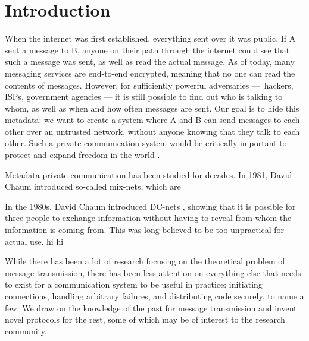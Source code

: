 \section{Introduction}

When the internet was first established, everything sent over it was public. If A sent a message to B, anyone on their path through the internet could see that such a message was sent, as well as read the actual message. As of today, many messaging services are end-to-end encrypted, meaning that no one can read the contents of messages. However, for sufficiently powerful adversaries — hackers, ISPs, government agencies — it is still possible to find out who is talking to whom, as well as when and how often messages are sent. Our goal is to hide this metadata: we want to create a system where A and B can send messages to each other over an untrusted network, without anyone knowing that they talk to each other. Such a private communication system would be critically important to protect and expand freedom in the world \cite{arvid}.

Metadata-private communication has been studied for decades. In 1981, David Chaum introduced so-called mix-nets, which are

In the 1980s, David Chaum introduced DC-nets \cite{chaum1988dining}, showing that it is possible for three people to exchange information without having to reveal from whom the information is coming from. This was long believed to be too unpractical for actual use. hi hi

While there has been a lot of research focusing on the theoretical problem of message transmission, there has been less attention on everything else that needs to exist for a communication system to be useful in practice: initiating connections, handling arbitrary failures, and distributing code securely, to name a few. We draw on the knowledge of the past for message transmission and invent novel protocols for the rest, some of which may be of interest to the research community.